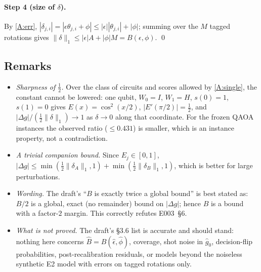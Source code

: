 \documentclass[11pt,a4paper]{article}
\theoremstyle{definition}
\theoremstyle{remark}
\newcommand{\eps}{\epsilon}
\begin{document}
\paragraph{Step 4 (size of $\delta$).} By \ref{A:err},
$|\delta_{j,i}|=|\eps\theta_{j,i}+\phi|\le|\eps||\theta_{j,i}|+|\phi|$; summing over
the $M$ tagged rotations gives $\|\delta\|_1\le|\eps|A+|\phi|M=B(\eps,\phi)$. \qed

\subsection{Remarks}
\begin{itemize}[leftmargin=1.2em]
\item \emph{Sharpness of $\tfrac12$.} Over the class of circuits and scores allowed by
\ref{A:single}, the constant cannot be lowered: one qubit, $W_0=I$, $W_1=H$,
$s(0)=1$, $s(1)=0$ gives $E(x)=\cos^2(x/2)$, $|E'(\pi/2)|=\tfrac12$, and
$|\Delta g|/(\tfrac12\|\delta\|_1)\to1$ as $\delta\to0$ along that coordinate. For the
frozen QAOA instances the observed ratio ($\le0.431$) is smaller, which is an
instance property, not a contradiction.
\item \emph{A trivial companion bound.} Since $E_j\in[0,1]$,
$|\Delta g|\le\min(\tfrac12\|\delta_A\|_1,1)+\min(\tfrac12\|\delta_B\|_1,1)$, which is
better for large perturbations.
\item \emph{Wording.} The draft's ``$B$ is exactly twice a global bound'' is best stated
as: $B/2$ is a global, exact (no remainder) bound on $|\Delta g|$; hence $B$ is a bound
with a factor-$2$ margin. This correctly refutes E003~§6.
\item \emph{What is not proved.} The draft's §3.6 list is accurate and should stand:
nothing here concerns $\hat B=B(\hat\eps,\hat\phi)$, coverage, shot noise in $\hat g_0$,
decision-flip probabilities, post-recalibration residuals, or models beyond the
noiseless synthetic E2 model with errors on tagged rotations only.
\end{itemize}

\end{document}
